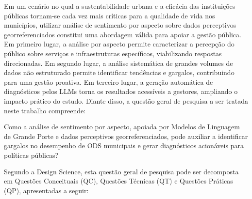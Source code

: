 {Em um cenário no qual a sustentabilidade urbana e a eficácia das instituições
públicas tornam-se cada vez mais críticas para a qualidade de vida nos
municípios, utilizar análise de sentimento por aspecto sobre dados
perceptivos georreferenciados constitui uma abordagem válida para apoiar a
gestão pública. Em primeiro lugar, a análise por aspecto permite
caracterizar a percepção do público sobre serviços e infraestruturas
específicos, viabilizando respostas direcionadas. Em segundo lugar, a análise sistemática de grandes volumes
de dados não estruturado permite identificar tendências e gargalos, contribuindo para uma gestão proativa.
Em terceiro lugar, a geração automática de diagnósticos pelos \gls{LLM}s
torna os resultados acessíveis a gestores,
ampliando o impacto prático do estudo. Diante disso, a questão geral de
pesquisa a ser tratada neste trabalho compreende:

\begin{citacao}
Como a análise de sentimento por aspecto, apoiada por Modelos de Linguagem
de Grande Porte e dados perceptivos georreferenciados, pode auxiliar a
identificar gargalos no desempenho de ODS municipais e gerar diagnósticos
acionáveis para políticas públicas?
\end{citacao}

Segundo a Design Science, esta questão geral de pesquisa pode ser
decomposta em Questões Conceituais (QC), Questões Técnicas (QT) e Questões
Práticas (QP), apresentadas a seguir:

}
